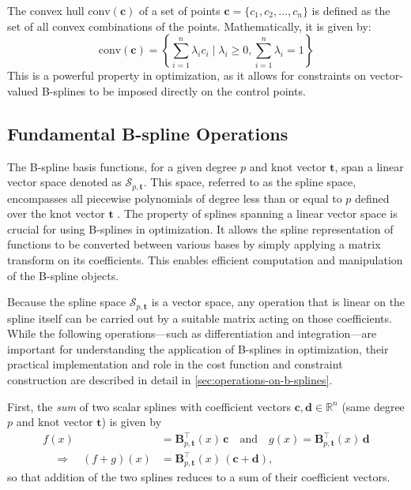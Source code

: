 The convex hull $\text{conv}(\mathbf{c})$ of a set of points $\mathbf{c} = \{c_1, c_2, \ldots, c_n\}$ is defined as the set of all convex combinations of the points. Mathematically, it is given by:
\begin{equation}
    \text{conv}(\mathbf{c}) = \left\{ \sum_{i=1}^n \lambda_i c_i \mid \lambda_i \geq 0, \sum_{i=1}^n \lambda_i = 1 \right\}
\end{equation}
This is a powerful property in optimization, as it allows for constraints on vector-valued B-splines to be imposed directly on the control points.


\subsection{Fundamental B-spline Operations}
\label{sec:b-spline-operations-theory}
The B-spline basis functions, for a given degree $p$ and knot vector $\mathbf{t}$, span a linear vector space denoted as $\mathcal{S}_{p, \mathbf{t}}$. This space, referred to as the spline space, encompasses all piecewise polynomials of degree less than or equal to $p$ defined over the knot vector $\mathbf{t}$ \citep{Grimstad2016}. The property of splines spanning a linear vector space is crucial for using B-splines in optimization. 
It allows the spline representation of functions to be converted between various bases by simply applying a matrix transform on its coefficients. This enables efficient computation and manipulation of the B-spline objects.

Because the spline space $\mathcal{S}_{p,\mathbf{t}}$ is a vector space, any operation that is linear on the spline itself can be carried out by a suitable matrix acting on those coefficients.  While the following operations---such as differentiation and integration---are important for understanding the application of B-splines in optimization, their practical implementation and role in the cost function and constraint construction are described in detail in \cref{sec:operations-on-b-splines}.

First, the \emph{sum} of two scalar splines with coefficient vectors $\mathbf{c},\mathbf{d}\in\mathbb R^n$ (same degree $p$ and knot vector $\mathbf{t}$) is given by
\begin{equation}
    \begin{aligned}
        f(x) &= \mathbf{B}_{p,\mathbf{t}}^\top(x)\,\mathbf{c}
        \quad\text{and}\quad
        g(x) = \mathbf{B}_{p,\mathbf{t}}^\top(x)\,\mathbf{d} \\
        \quad\Longrightarrow\quad
        (f+g)(x)
        &= \mathbf{B}_{p,\mathbf{t}}^\top(x)\,(\mathbf{c}+\mathbf{d})\!,
    \end{aligned}
\end{equation}
so that addition of the two splines reduces to a sum of their coefficient vectors.  

